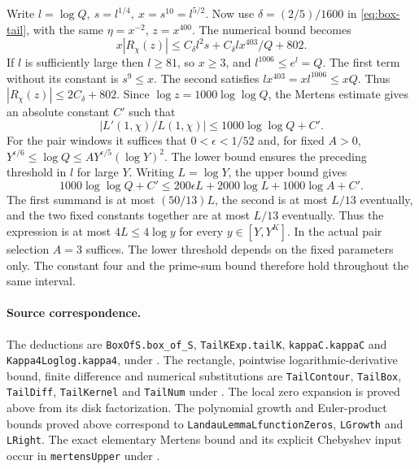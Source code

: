 Write \(l=\log Q,\ s=l^{1/4},\ x=s^{10}=l^{5/2}\). Now use
\(\delta=(2/5)/1600\) in \eqref{eq:box-tail}, with the same
\(\eta=x^{-2}\), \(z=x^{400}\). The numerical bound becomes
\[
 x|R_\chi(z)|\le C_\delta l^2 s+
                 C_\delta l x^{403}/Q+802 .
\]
If \(l\) is sufficiently large then \(l\ge81\), so \(x\ge3\),
and \(l^{1006}\le e^l=Q\). The first term without its constant
is \(s^9\le x\). The second satisfies \(lx^{403}=x l^{1006}\le xQ\).
Thus \(|R_\chi(z)|\le 2C_\delta+802\). Since
\(\log z=1000\log\log Q\), the Mertens estimate gives an absolute
constant \(C'\) such that
\[
       |L'(1,\chi)/L(1,\chi)|\le1000\log\log Q+C'.
\]
For the pair windows it suffices that \(0<\epsilon<1/52\) and,
for fixed \(A>0\),
\(
 Y^{\epsilon/6}\le\log Q\le A Y^{\epsilon/5}(\log Y)^2.
\)
The lower bound ensures the preceding threshold in \(l\) for
large \(Y\). Writing \(L=\log Y\), the upper bound gives
\[
 1000\log\log Q+C'\le200\epsilon L+2000\log L+1000\log A+C'.
\]
The first summand is at most \((50/13)L\), the second is at most
\(L/13\) eventually, and the two fixed constants together are at
most \(L/13\) eventually. Thus the expression is at most
\(4L\le4\log y\) for every \(y\in[Y,Y^K]\). In the actual
pair selection \(A=3\) suffices. The lower threshold depends
on the fixed parameters only. The constant four and the
prime-sum bound therefore hold throughout the same interval.

\paragraph{Source correspondence.}
The deductions are \texttt{BoxOfS.box\_of\_S}, \texttt{TailKExp.tailK},
\texttt{kappaC.kappaC} and \texttt{Kappa4Loglog.kappa4}, under
.
The rectangle, pointwise logarithmic-derivative bound, finite
difference and numerical substitutions are \texttt{TailContour},
\texttt{TailBox}, \texttt{TailDiff}, \texttt{TailKernel} and
\texttt{TailNum} under
.
The local zero expansion is proved above from its disk factorization.
The polynomial growth and Euler-product bounds proved above correspond to \texttt{LandauLemmaLfunctionZeros},
\texttt{LGrowth} and \texttt{LRight}. The exact elementary Mertens
bound and its explicit Chebyshev input occur in \texttt{mertensUpper}
under .
